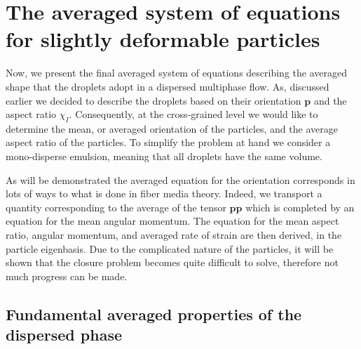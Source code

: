 \section{The averaged system of equations for slightly deformable particles}
\label{sec:averaged_eq}


Now, we present the final averaged system of equations describing the averaged shape that the droplets adopt in a dispersed multiphase flow. 
As, discussed earlier we decided to describe the droplets based on their orientation $\textbf{p}$ and the aspect ratio $\chi_I$.
Consequently, at the cross-grained level we would like to determine the mean, or averaged orientation of the particles, and the average aspect ratio of the particles.  
To simplify the problem at hand we consider a mono-disperse emulsion, meaning that all droplets have the same volume. 

As will be demonstrated the averaged equation for the orientation corresponds in lots of ways to what is done in fiber media theory. 
Indeed, we transport a quantity corresponding to the average of the tensor $\textbf{pp}$ which is completed by an equation for the mean angular momentum. 
The equation for the mean aspect ratio, angular momentum, and averaged rate of strain are then derived, in the particle eigenbasis.
Due to the complicated nature of the particles, it will be shown that the closure problem becomes quite difficult to solve, therefore not much progress can be made. 

\subsection{Fundamental averaged properties of the dispersed phase} 

